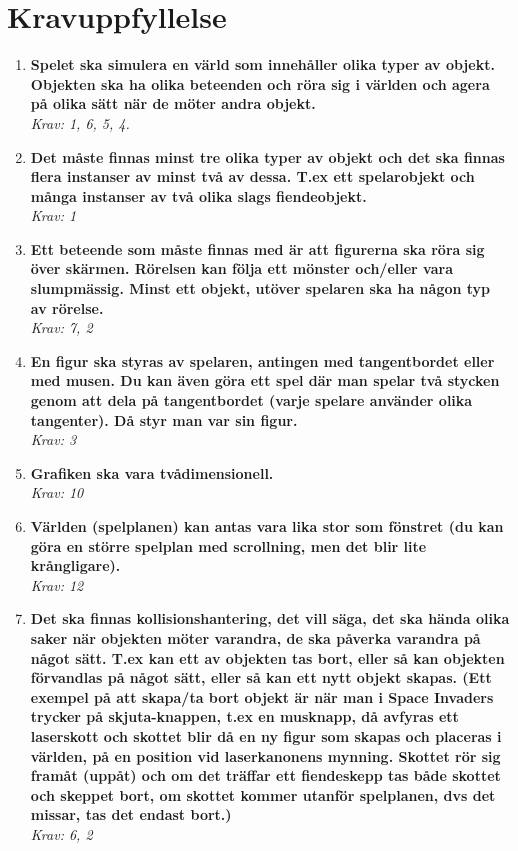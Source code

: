 \documentclass[12pt]{TDP005mall}
\begin{document}
\section{Kravuppfyllelse}
\begin{enumerate}
    \item \textbf{Spelet ska simulera en värld som innehåller olika typer av objekt. Objekten ska ha olika beteenden och röra sig i världen och agera på olika sätt när de möter andra objekt.} \\ \emph{Krav: 1, 6, 5, 4.}
    
    \item \textbf{Det måste finnas minst tre olika typer av objekt och det ska finnas flera instanser av minst två av dessa. T.ex ett spelarobjekt och många instanser av två olika slags fiendeobjekt.} \\ \emph{Krav: 1}
    
    \item \textbf{Ett beteende som måste finnas med är att figurerna ska röra sig över skärmen. Rörelsen kan följa ett mönster och/eller vara slumpmässig. Minst ett objekt, utöver spelaren ska ha någon typ av rörelse.} \\ \emph{Krav: 7, 2}
    
    \item \textbf{En figur ska styras av spelaren, antingen med tangentbordet eller med musen. Du kan även göra ett spel där man spelar två stycken genom att dela på tangentbordet (varje spelare använder olika tangenter). Då styr man var sin figur.} \\ \emph{Krav: 3}
    
    \item \textbf{Grafiken ska vara tvådimensionell.} \\ \emph{Krav: 10}
    
    \item \textbf{Världen (spelplanen) kan antas vara lika stor som fönstret (du kan göra en större spelplan med scrollning, men det blir lite krångligare).} \\ \emph{Krav: 12}
    
    \item \textbf{Det ska finnas kollisionshantering, det vill säga, det ska hända olika saker när objekten möter varandra, de ska påverka varandra på något sätt. T.ex kan ett av objekten tas bort, eller så kan objekten förvandlas på något sätt, eller så kan ett nytt objekt skapas. (Ett exempel på att skapa/ta bort objekt är när man i Space Invaders trycker på skjuta-knappen, t.ex en musknapp, då avfyras ett laserskott och skottet blir då en ny figur som skapas och placeras i världen, på en position vid laserkanonens mynning. Skottet rör sig framåt (uppåt) och om det träffar ett fiendeskepp tas både skottet och skeppet bort, om skottet kommer utanför spelplanen, dvs det missar, tas det endast bort.)} \\ \emph{Krav: 6, 2}
    

\end{enumerate}
\end{document}
